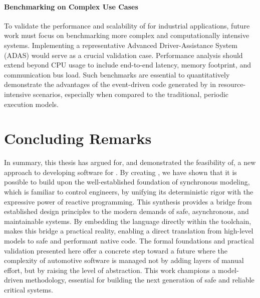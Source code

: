 \paragraph{Benchmarking on Complex Use Cases}
To validate the performance and scalability of \GRust for industrial applications, future work must
focus on benchmarking more complex and computationally intensive systems. Implementing a
representative Advanced Driver-Assistance System (ADAS) would serve as a crucial validation case.
Performance analysis should extend beyond CPU usage to include end-to-end latency, memory footprint,
and communication bus load. Such benchmarks are essential to quantitatively demonstrate the
advantages of the event-driven code generated by \GRust in resource-intensive scenarios, especially
when compared to the traditional, periodic execution models.

\section{Concluding Remarks}
\label{sec:conclusion:remarks}

In summary, this thesis has argued for, and demonstrated the feasibility of, a new approach to
developing software for \sdv. By creating \GRust, we have shown that it is possible to build upon
the well-established foundation of synchronous modeling, which is familiar to control engineers, by
unifying its deterministic rigor with the expressive power of reactive programming.
%
This synthesis provides a bridge from established design principles to the modern demands of safe,
asynchronous, and maintainable systems. By embedding the language directly within the \Rust
toolchain, \GRust makes this bridge a practical reality, enabling a direct translation from
high-level models to safe and performant native code.
%
The formal foundations and practical validation presented here offer a concrete step toward a future
where the complexity of automotive software is managed not by adding layers of manual effort, but by
raising the level of abstraction. This work champions a model-driven methodology, essential for
building the next generation of safe and reliable critical systems.
